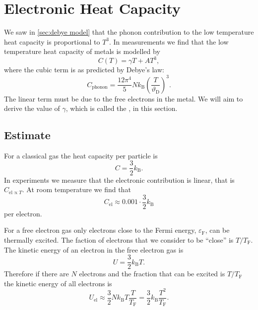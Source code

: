 \documentclass[fleqn]{NotesClass}
\newcommand*{\boltzmann}{k_{\mathrm{B}}}
\newcommand*{\debye}{\mathrm{D}}
\newcommand*{\fermi}{\mathrm{F}}
\begin{document}
    \section{Electronic Heat Capacity}
    We saw in \cref{sec:debye model} that the phonon contribution to the low temperature heat capacity is proportional to \(T^3\).
    In measurements we find that the low temperature heat capacity of metals is modelled by
    \begin{equation}
        C(T) = \gamma T + AT^3,
    \end{equation}
    where the cubic term is as predicted by Debye's law:
    \begin{equation}
        C_{\mathrm{phonon}} = \frac{12\pi^4}{5}N\boltzmann \left( \frac{T}{\vartheta_{\debye}} \right)^{3}.
    \end{equation}
    The linear term must be due to the free electrons in the metal.
    We will aim to derive the value of \(\gamma\), which is called the , in this section.
    
    \subsection{Estimate}
    For a classical gas the heat capacity per particle is
    \begin{equation}
        C = \frac{3}{2}\boltzmann.
    \end{equation}
    In experiments we measure that the electronic contribution is linear, that is \(C_{\mathrm{el} \propto T}\).
    At room temperature we find that
    \begin{equation}
        C_{\mathrm{el}} \approx 0.001 \cdot \frac{3}{2}\boltzmann
    \end{equation}
    per electron.
    
    For a free electron gas only electrons close to the Fermi energy, \(\varepsilon_{\fermi}\), can be thermally excited.
    The faction of electrons that we consider to be \enquote{close} is \(T/T_{\fermi}\).
    The kinetic energy of an electron in the free electron gas is
    \begin{equation}
        U = \frac{3}{2}\boltzmann T.
    \end{equation}
    Therefore if there are \(N\) electrons and the fraction that can be excited is \(T/T_{\fermi}\) the kinetic energy of all electrons is
    \begin{equation}
        U_{\mathrm{el}} \approx \frac{3}{2}N\boltzmann T \frac{T}{T_{\fermi}} = \frac{3}{2}\boltzmann \frac{T^2}{T_{\fermi}}.
    \end{equation}
    
\end{document}
